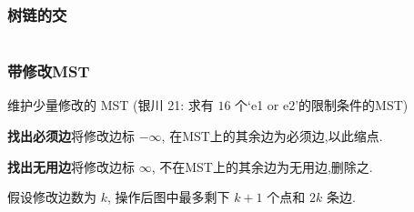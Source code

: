 \subsubsection{树链的交}
	\inputminted{cpp}{src/TreeandGraph/path_inter.cpp}

\subsubsection{带修改MST}
    维护少量修改的 MST (银川 21: 求有 $16$ 个`e1 or e2'的限制条件的MST) 
    \par \textbf{找出必须边}将修改边标 $-\infty$, 在MST上的其余边为必须边,以此缩点.
    \par \textbf{找出无用边}将修改边标 $\infty$, 不在MST上的其余边为无用边,删除之. 
    \par 假设修改边数为 $k$, 操作后图中最多剩下 $k+1$ 个点和 $2k$ 条边.
    

